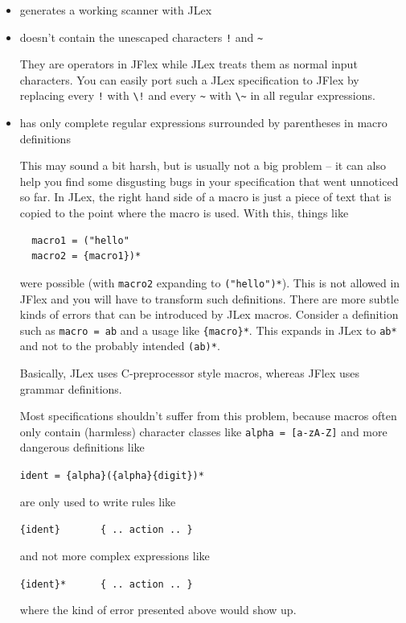 \begin{itemize}
\item
  generates a working scanner with JLex
\item
  doesn't contain the unescaped characters \texttt{!} and
  \texttt{\textasciitilde{}}

  They are operators in JFlex while JLex treats them as normal input
  characters. You can easily port such a JLex specification to JFlex by
  replacing every \texttt{!} with \texttt{\textbackslash{}!} and every
  \texttt{\textasciitilde{}} with
  \texttt{\textbackslash{}\textasciitilde{}} in all regular expressions.
\item
  has only complete regular expressions surrounded by parentheses in
  macro definitions

  This may sound a bit harsh, but is usually not a big problem -- it can
  also help you find some disgusting bugs in your specification that
  went unnoticed so far. In JLex, the right hand side of a macro is just
  a piece of text that is copied to the point where the macro is used.
  With this, things like

\begin{verbatim}
  macro1 = ("hello"
  macro2 = {macro1})*
\end{verbatim}

  were possible (with \texttt{macro2} expanding to \texttt{("hello")*}).
  This is not allowed in JFlex and you will have to transform such
  definitions. There are more subtle kinds of errors that can be
  introduced by JLex macros. Consider a definition such as
  \texttt{macro\ =\ a\textbar{}b} and a usage like \texttt{\{macro\}*}.
  This expands in JLex to \texttt{a\textbar{}b*} and not to the probably
  intended \texttt{(a\textbar{}b)*}.

  Basically, JLex uses C-preprocessor style macros, whereas JFlex uses
  grammar definitions.

  Most specifications shouldn't suffer from this problem, because macros
  often only contain (harmless) character classes like
  \texttt{alpha\ =\ {[}a-zA-Z{]}} and more dangerous definitions like

  \texttt{ident\ =\ \{alpha\}(\{alpha\}\textbar{}\{digit\})*}

  are only used to write rules like

  \texttt{\{ident\}\ \ \ \ \ \ \ \{\ ..\ action\ ..\ \}}

  and not more complex expressions like

  \texttt{\{ident\}*\ \ \ \ \ \ \{\ ..\ action\ ..\ \}}

  where the kind of error presented above would show up.
\end{itemize}

